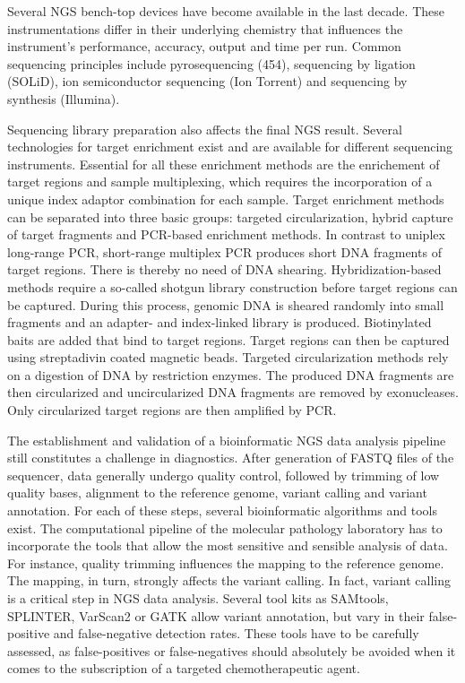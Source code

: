 {{      Several NGS
      bench-top devices have become available in the last decade. These
      instrumentations differ in their underlying chemistry that influences the
      instrument’s performance, accuracy, output and time per run. Common
      sequencing principles include pyrosequencing (454), sequencing by ligation
      (SOLiD), ion semiconductor sequencing (Ion Torrent) and sequencing by
      synthesis (Illumina).

      Sequencing library preparation also affects the final NGS result. Several
      technologies for target enrichment exist and are available for different
      sequencing instruments. Essential for all these enrichment methods
      are the enrichement of target regions and sample multiplexing, which
      requires the incorporation of a unique index adaptor combination for each
      sample. Target enrichment methods can be separated into three basic
      groups: targeted circularization, hybrid capture of target fragments and
      PCR-based enrichment methods. In contrast to uniplex long-range PCR,
      short-range multiplex PCR produces short DNA fragments of target regions.
      There is thereby no need of DNA shearing. Hybridization-based methods
      require a so-called shotgun library construction before target regions can
      be captured. During this process, genomic DNA is sheared randomly into
      small fragments and an adapter- and index-linked library is produced.
      Biotinylated baits are added that bind to target regions. Target regions
      can then be captured using streptadivin coated magnetic beads. Targeted
      circularization methods rely on a digestion of DNA by restriction enzymes.
      The produced DNA fragments are then circularized and uncircularized DNA
      fragments are removed by exonucleases. Only circularized target regions
      are then amplified by PCR.

      The establishment and validation of a bioinformatic NGS data analysis
      pipeline still constitutes a challenge in diagnostics. After generation of
      FASTQ files of the sequencer, data generally undergo quality control,
      followed by trimming of low quality bases, alignment to the reference
      genome, variant calling and variant annotation. For each of these steps,
      several bioinformatic algorithms and tools exist. The computational
      pipeline of the molecular pathology laboratory has to incorporate the
      tools that allow the most sensitive and sensible analysis of data. For
      instance, quality trimming influences the mapping to the reference genome.
      The mapping, in turn, strongly affects the variant calling. In fact,
      variant calling is a critical step in NGS data analysis. Several tool kits
      as SAMtools, SPLINTER, VarScan2 or GATK allow variant annotation, but vary
      in their false-positive and false-negative detection rates.
      These tools have to be carefully assessed, as false-positives or
      false-negatives should absolutely be avoided when it comes to the
      subscription of a targeted chemotherapeutic agent.

}}
